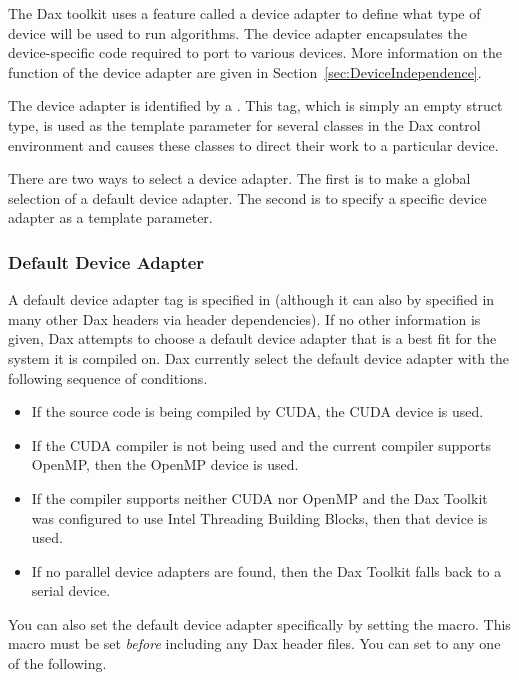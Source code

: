 
The Dax toolkit uses a feature called a device adapter to define what type
of device will be used to run algorithms. The device adapter encapsulates
the device-specific code required to port to various devices. More
information on the function of the device adapter are given in
Section~\ref{sec:DeviceIndependence}.

The device adapter is identified by a .
 This tag, which is simply an empty struct type,
is used as the template parameter for several classes in the Dax control
environment and causes these classes to direct their work to a particular
device.

There are two ways to select a device adapter. The first is to make a
global selection of a default device adapter. The second is to specify a
specific device adapter as a template parameter.

\subsubsection{Default Device Adapter}

A default device adapter tag is specified in
 (although it can also by specified in
many other Dax headers via header dependencies). If no other information is
given, Dax attempts to choose a default device adapter that is a best fit
for the system it is compiled on. Dax currently select the default device
adapter with the following sequence of conditions.

\begin{itemize}
\item {} If the source code is being compiled by CUDA, the CUDA
  device is used.
\item {} If the CUDA compiler is not being used and the current
  compiler supports OpenMP, then the OpenMP device is used.
\item {}  If the compiler
  supports neither CUDA nor OpenMP and the Dax Toolkit was configured to
  use Intel Threading Building Blocks, then that device is used.
\item {} If no parallel device adapters are found, then the Dax
  Toolkit falls back to a serial device.
\end{itemize}

You can also set the default device adapter specifically by setting the
 macro. This macro must be set \emph{before}
including any Dax header files. You can set 
to any one of the following.

